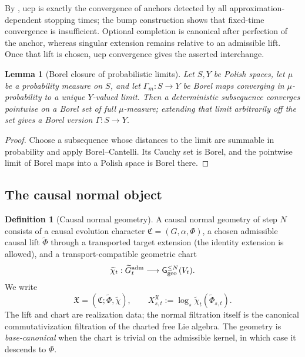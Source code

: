 \documentclass[10pt,reqno]{amsart}
\theoremstyle{plain}
\newtheorem{lemma}[theorem]{Lemma}
\theoremstyle{definition}
\newtheorem{definition}[theorem]{Definition}
\theoremstyle{remark}
\begin{document}
By , ucp is exactly the convergence of
anchors detected by all approximation-dependent stopping times; the bump
construction shows that fixed-time convergence is insufficient.  Optional
completion is canonical after perfection of the anchor, whereas singular
extension remains relative to an admissible lift.  Once that lift is chosen,
ucp convergence gives the asserted interchange.

\begin{lemma}[Borel closure of probabilistic limits]
\label{cc:lem-borel-probability-limit}
Let \(S,Y\) be Polish spaces, let \(\mu\) be a probability measure on
\(S\), and let \(\Gamma_m:S\to Y\) be Borel maps converging in
\(\mu\)-probability to a unique \(Y\)-valued limit.  Then a deterministic
subsequence converges pointwise on a Borel set of full \(\mu\)-measure;
extending that limit arbitrarily off the set gives a Borel version
\(\Gamma:S\to Y\).
\end{lemma}

\begin{proof}
Choose a subsequence whose distances to the limit are summable in
probability and apply Borel--Cantelli.  Its Cauchy set is Borel, and the
pointwise limit of Borel maps into a Polish space is Borel there.
\end{proof}

\subsection{The causal normal object}
\label{cc:subsec-causal-normal-object}

\begin{definition}[Causal normal geometry]
\label{cc:def-causal-normal-geometry}
A causal normal geometry of step \(N\) consists of a causal evolution
character \(\mathfrak C=(G,\alpha,\Phi)\), a chosen admissible causal lift
\(\widetilde\Phi\) through a transported target extension (the identity
extension is allowed), and a transport-compatible geometric chart
\[
 \widetilde\chi_t:\widetilde G_t^{\rm adm}
 \longrightarrow\mathsf G_{\rm geo}^{\le N}(V_t).
\]
We write
\[
 \mathfrak X=(\mathfrak C;\widetilde\Phi,\widetilde\chi),
 \qquad
 X^{\mathfrak X}_{s,t}
 :=\log_\star\widetilde\chi_t(\widetilde\Phi_{s,t}).
\]
The lift and chart are realization data; the normal filtration itself is the
canonical commutativization filtration of the charted free Lie algebra.  The
geometry is \emph{base-canonical} when the chart is trivial on the
admissible kernel, in which case it descends to \(\Phi\).
\end{definition}
\end{document}
